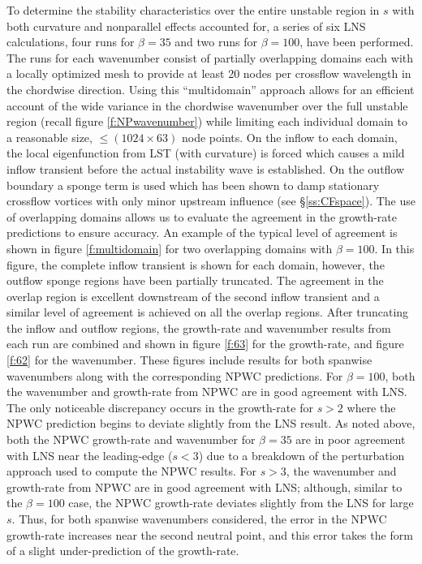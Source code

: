 To determine the stability characteristics over the entire unstable region in
$s$ with both curvature and nonparallel effects accounted for, a series of six
LNS calculations, four runs for $\beta=35$ and two runs for
$\beta=100$, have been performed.  The runs for each wavenumber consist of
partially overlapping domains each with a locally optimized mesh to provide at
least 20 nodes per crossflow wavelength in the chordwise direction.  Using
this ``multidomain'' approach allows for an efficient account of the wide
variance in the chordwise wavenumber over the full unstable region (recall
figure \ref{f:NPwavenumber}) while limiting each individual domain to a
reasonable size, $\le (1024 \times 63)$ node points.  On the inflow to each
domain, the local eigenfunction from LST (with curvature) is forced which
causes a mild inflow transient before the actual instability wave is
established.  On the outflow boundary a sponge term is used which has been
shown to damp stationary crossflow vortices with only minor upstream influence
(see \S\ref{ss:CFspace}).  The use of overlapping domains allows us to
evaluate the agreement in the growth-rate predictions to ensure accuracy.  An
example of the typical level of agreement is shown in figure
\ref{f:multidomain} for two overlapping domains with $\beta=100$.  In this
figure, the complete inflow transient is shown for each domain, however, the
outflow sponge regions have been partially truncated.  The agreement in the
overlap region is excellent downstream of the second inflow transient and a
similar level of agreement is achieved on all the overlap regions.  After
truncating the inflow and outflow regions, the growth-rate and wavenumber
results from each run are combined and shown in figure \ref{f:63} for the
growth-rate, and figure \ref{f:62} for the wavenumber.  These figures include
results for both spanwise wavenumbers along with the corresponding NPWC
predictions.  For $\beta=100$, both the wavenumber and growth-rate from NPWC
are in good agreement with LNS.  The only noticeable discrepancy occurs in the
growth-rate for $s>2$ where the NPWC prediction begins to deviate slightly
from the LNS result.  As noted above, both the NPWC growth-rate and wavenumber
for $\beta=35$ are in poor agreement with LNS near the leading-edge ($s<3$)
due to a breakdown of the perturbation approach used to compute the NPWC
results.  For $s>3$, the wavenumber and growth-rate from NPWC are in good
agreement with LNS; although, similar to the $\beta=100$ case, the NPWC
growth-rate deviates slightly from the LNS for large $s$.  Thus, for both
spanwise wavenumbers considered, the error in the NPWC growth-rate increases
near the second neutral point, and this error takes the form of a slight
under-prediction of the growth-rate.

